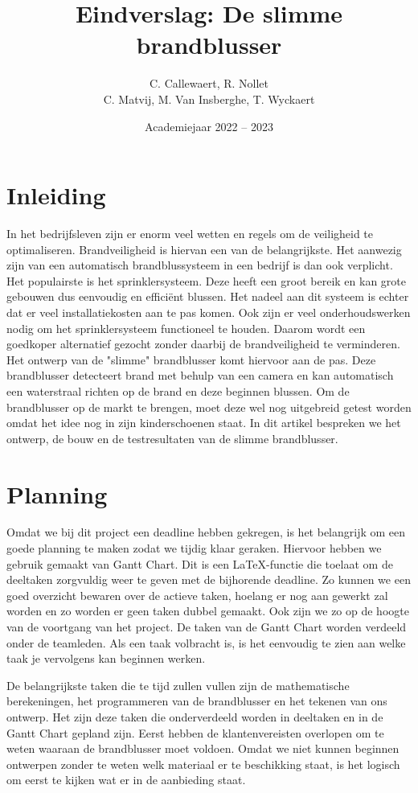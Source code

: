 \documentclass{kulakarticle}
\title{Eindverslag: De slimme brandblusser}
\author{C. Callewaert, R. Nollet \\
	 C. Matvij, M. Van Insberghe, T. Wyckaert }
\date{Academiejaar 2022 -- 2023}
\begin{document}
	
\maketitle

\tableofcontents
	
\section*{Inleiding}

In het bedrijfsleven zijn er enorm veel wetten en regels om de veiligheid te optimaliseren. Brandveiligheid is hiervan een van de belangrijkste. Het aanwezig zijn van een automatisch brandblussysteem in een bedrijf is dan ook verplicht. Het populairste is het sprinklersysteem. Deze heeft een groot bereik en kan grote gebouwen dus eenvoudig en efficiënt blussen. Het nadeel aan dit systeem is echter dat er veel installatiekosten aan te pas komen. Ook zijn er veel onderhoudswerken nodig om het sprinklersysteem functioneel te houden. Daarom wordt een goedkoper alternatief gezocht zonder daarbij de brandveiligheid te verminderen. Het ontwerp van de "slimme" brandblusser komt hiervoor aan de pas. Deze brandblusser detecteert brand met behulp van een camera en kan automatisch een waterstraal richten op de brand en deze beginnen blussen. Om  de brandblusser op de markt te brengen, moet deze wel nog uitgebreid getest worden omdat het idee nog in zijn kinderschoenen staat. In dit artikel bespreken we het ontwerp, de bouw en de testresultaten van de slimme brandblusser. 

\section{Planning}

Omdat we bij dit project een deadline hebben gekregen, is het belangrijk om een goede planning te maken zodat we tijdig klaar geraken. Hiervoor hebben we gebruik gemaakt van Gantt Chart. Dit is een \LaTeX-functie die toelaat om de deeltaken zorgvuldig weer te geven met de bijhorende deadline. Zo kunnen we een goed overzicht bewaren over de actieve taken, hoelang er nog aan gewerkt zal worden en zo worden er geen taken dubbel gemaakt. Ook zijn we zo op de hoogte van de voortgang van het project.  De taken van de Gantt Chart worden verdeeld onder de teamleden. Als een taak volbracht is, is het eenvoudig  te zien aan welke taak je vervolgens kan beginnen werken.

De belangrijkste taken die te tijd zullen vullen zijn de mathematische berekeningen, het programmeren van de brandblusser en het tekenen van ons ontwerp. Het zijn deze taken die onderverdeeld worden in deeltaken en in de Gantt Chart gepland zijn. Eerst hebben de klantenvereisten overlopen om te weten waaraan de brandblusser moet voldoen. Omdat we niet kunnen beginnen ontwerpen zonder te weten welk materiaal er te beschikking staat, is het logisch om eerst te kijken wat er in de aanbieding staat. 
\end{document}
